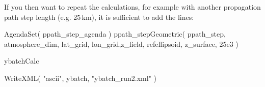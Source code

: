 If you then want to repeat the calculations, for example with another
propagation path step length (e.g. 25\,km), it is sufficient to add
the lines:

\begin{code}
AgendaSet( ppath_step_agenda ){
   ppath_stepGeometric( ppath_step, atmosphere_dim, lat_grid,
                        lon_grid,z_field, refellipsoid, z_surface,
                        25e3 )
}

ybatchCalc

WriteXML( "ascii", ybatch, "ybatch_run2.xml" )
\end{code}


